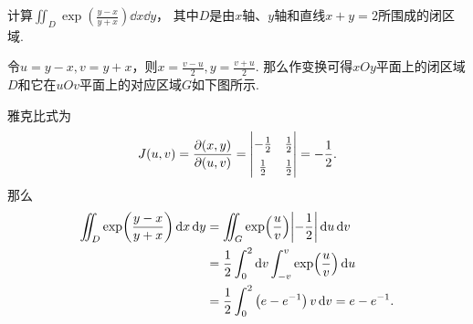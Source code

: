 \begin{example}
计算\(\iint_D \exp(\frac{y-x}{y+x}) \dd{x} \dd{y}\)，
其中\(D\)是由\(x\)轴、\(y\)轴和直线\(x+y=2\)所围成的闭区域.
\begin{solution}
令\(u = y-x, v = y+x\)，则\(x = \frac{v-u}{2}, y = \frac{v+u}{2}\).
那么作变换可得\(xOy\)平面上的闭区域\(D\)和它在\(uOv\)平面上的对应区域\(G\)如下图所示.

\begin{figure}[htb]
	\def\subwidth{.5\linewidth}
	\begin{subfigure}[b]{\subwidth}
		\centering
		\subcaption{}
	\end{subfigure}%
	\begin{subfigure}[b]{\subwidth}
		\centering
		\subcaption{}
	\end{subfigure}%
	\caption{}
\end{figure}

雅克比式为\[
	J(u,v)
	= \jacobi{x,y}{u,v}
	= \def\arraystretch{1.5} \begin{vmatrix}
	-\frac12 & \frac12 \\
	\frac12 & \frac12
	\end{vmatrix}
	= - \frac12.
\]
那么\begin{align*}
	\iint_D \exp(\frac{y-x}{y+x}) \dd{x} \dd{y}
	&= \iint_G \exp(\frac{u}{v}) \abs{-\frac12} \dd{u} \dd{v} \\
	&= \frac12 \int_0^2 \dd{v} \int_{-v}^v \exp(\frac{u}{v}) \dd{u} \\
	&= \frac12 \int_0^2 \left( e - e^{-1} \right) v \dd{v}
	= e - e^{-1}.
\end{align*}
\end{solution}
\end{example}

